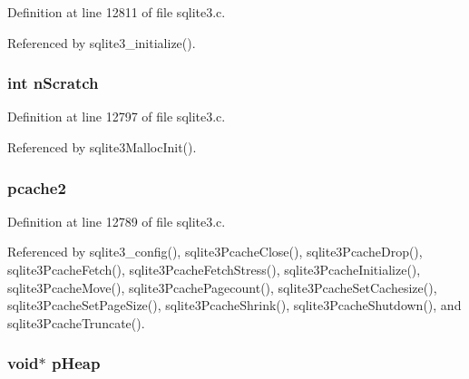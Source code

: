 Definition at line 12811 of file sqlite3.\+c.



Referenced by sqlite3\+\_\+initialize().

\hypertarget{struct_sqlite3_config_a7810b251a0971066e959228e5ec17ba5}{}
\subsubsection[{n\+Scratch}]{\setlength{\rightskip}{0pt plus 5cm}int n\+Scratch}\label{struct_sqlite3_config_a7810b251a0971066e959228e5ec17ba5}


Definition at line 12797 of file sqlite3.\+c.



Referenced by sqlite3\+Malloc\+Init().

\hypertarget{struct_sqlite3_config_a78ebacd69f832305f42dec645ba48a2c}{}
\subsubsection[{pcache2}]{ pcache2}\label{struct_sqlite3_config_a78ebacd69f832305f42dec645ba48a2c}


Definition at line 12789 of file sqlite3.\+c.



Referenced by sqlite3\+\_\+config(), sqlite3\+Pcache\+Close(), sqlite3\+Pcache\+Drop(), sqlite3\+Pcache\+Fetch(), sqlite3\+Pcache\+Fetch\+Stress(), sqlite3\+Pcache\+Initialize(), sqlite3\+Pcache\+Move(), sqlite3\+Pcache\+Pagecount(), sqlite3\+Pcache\+Set\+Cachesize(), sqlite3\+Pcache\+Set\+Page\+Size(), sqlite3\+Pcache\+Shrink(), sqlite3\+Pcache\+Shutdown(), and sqlite3\+Pcache\+Truncate().

\hypertarget{struct_sqlite3_config_a5d36d9050528de8c61e7be52131215e6}{}
\subsubsection[{p\+Heap}]{\setlength{\rightskip}{0pt plus 5cm}void$\ast$ p\+Heap}\label{struct_sqlite3_config_a5d36d9050528de8c61e7be52131215e6}


